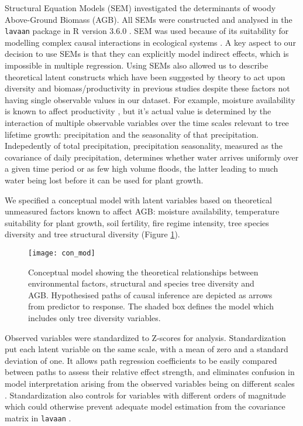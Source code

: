 \documentclass[11pt,a4paper]{article}
\begin{document}
Structural Equation Models (SEM) investigated the determinants of woody Above-Ground Biomass (AGB). All SEMs were constructed and analysed in the \verb|lavaan| package in R version 3.6.0 \citep{R}. SEM was used because of its suitability for modelling complex causal interactions in ecological systems \citep{Lehmann2014_161-166}. A key aspect to our decision to use SEMs is that they can explicitly model indirect effects, which is impossible in multiple regression. Using SEMs also allowed us to describe theoretical latent constructs which have been suggested by theory to act upon diversity and biomass/productivity in previous studies despite these factors not having single observable values in our dataset. For example, moisture availability is known to affect productivity \citep{}, but it's actual value is determined by the interaction of multiple observable variables over the time scales relevant to tree lifetime growth: precipitation and the seasonality of that precipitation. Indepedently of total precipitation, precipitation seasonality, measured as the covariance of daily precipitation, determines whether water arrives uniformly over a given time period or as few high volume floods, the latter leading to much water being lost before it can be used for plant growth. 

We specified a conceptual model with latent variables based on theoretical unmeasured factors known to affect AGB: moisture availability, temperature suitability for plant growth, soil fertility, fire regime intensity, tree species diversity and tree structural diversity (Figure \ref{con_mod}). 

\begin{figure}[H]
\centering
	\texttt{[image: con\_mod]}
	\caption{Conceptual model showing the theoretical relationships between environmental factors, structural and species tree diversity and AGB. Hypothesised paths of causal inference are depicted as arrows from predictor to response. The shaded box defines the model which includes only tree diversity variables.}
	\label{con_mod}
\end{figure}

Observed variables were standardized to Z-scores for analysis. Standardization put each latent variable on the same scale, with a mean of zero and a standard deviation of one. It allows path regression coefficients to be easily compared between paths to assess their relative effect strength, and eliminates confusion in model interpretation arising from the observed variables being on different scales \citep{}. Standardization also controls for variables with different orders of magnitude which could otherwise prevent adequate model estimation from the covariance matrix in \verb|lavaan| \citep{}. 
\end{document}
